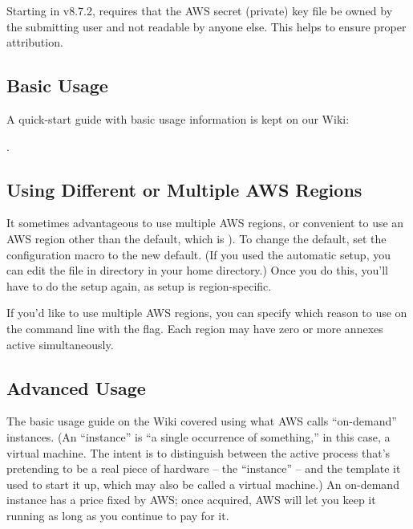 Starting in v8.7.2,  requires that the AWS secret (private) key file
be owned by the submitting user and not readable by anyone else.  This
helps to ensure proper attribution.

\subsection{Basic Usage}

A quick-start guide with basic usage information is kept on our Wiki:


.

\subsection{Using Different or Multiple AWS Regions}

It sometimes advantageous to use multiple AWS regions, or convenient to use
an AWS region other than the default, which is ).  To change
the default, set the configuration macro 
to the new default.  (If you used the  automatic setup, you
can edit the  file in  directory in
your home directory.)  Once you do this, you'll have to do the setup again,
as setup is region-specific.

If you'd like to use multiple AWS regions, you can specify which reason to use
on the command line with the  flag.  Each region may have
zero or more annexes active simultaneously.

\subsection{Advanced Usage}

The basic usage guide on the Wiki covered using what AWS calls ``on-demand''
instances.  (An ``instance'' is ``a single occurrence of something,'' in
this case, a virtual machine.  The intent is to distinguish between the
active process that's pretending to be a real piece of hardware --
the ``instance'' -- and the template it used to start it up, which may also
be called a virtual machine.)  An on-demand instance has a price fixed by AWS;
once acquired, AWS will let you keep it running as long as you continue to
pay for it.

